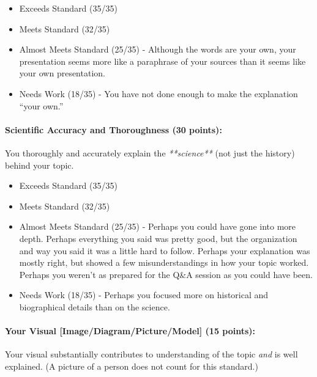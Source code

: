\documentclass[10pt]{exam}
\begin{document}
\begin{itemize}
  \item Exceeds Standard (35/35)
  \item Meets Standard (32/35)
  \item Almost Meets Standard (25/35) - 
    Although the words are your own, your presentation seems more like a paraphrase of your sources than it seems like your own presentation. 
  \item Needs Work (18/35) -
    You have not done enough to make the explanation ``your own.''
  
\end{itemize}



\paragraph{Scientific Accuracy and Thoroughness (30 points):} 
  You thoroughly and accurately explain the \emph{**science**} (not just the history) behind your topic.
  

\begin{itemize}
  \item Exceeds Standard (35/35)
  \item Meets Standard (32/35)
  \item Almost Meets Standard (25/35) - 
    Perhaps you could have gone into more depth.  Perhaps everything you said was pretty good, but the organization and way you said it was a little hard to follow.  Perhaps your explanation was mostly right, but showed a few misunderstandings in how your topic worked.  Perhaps you weren't as prepared for the Q\&A session as you could have been.
  \item Needs Work (18/35) -
    Perhaps you focused more on historical and biographical details than on the science.
  
\end{itemize}



\paragraph{Your Visual [Image/Diagram/Picture/Model] (15 points): } 
  Your visual substantially contributes to understanding of the topic \emph{and} is well explained. (A picture of a person does not count for this standard.) 
  
\end{document}
